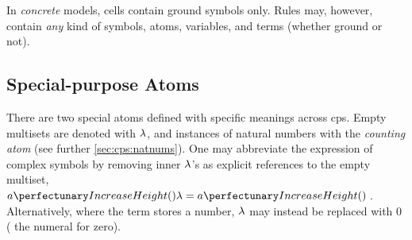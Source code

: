 In \emph{concrete} models, cells contain ground symbols only.
Rules may, however, contain \emph{any} kind of symbols, atoms, variables, and terms (whether ground or not).

\subsection{\label{sec:cps:specialpurposeatoms}Special-purpose Atoms} 

There are two special atoms defined with specific meanings across \gls{cps}.  Empty multisets are denoted with \(\lambda\), and instances of natural numbers with the \emph{counting atom} (see further \vref{sec:cps:natnums}).
One may abbreviate the expression of complex symbols by removing inner \(\lambda\)'s as explicit references to the empty multiset, \eg{}~\(\cpfunc{a}{\cpempty} = \cpfunc{a}{\,}\).  Alternatively, where the term stores a number, \(\lambda\) may instead be replaced with \(0\) (\ie{} the numeral for zero).

